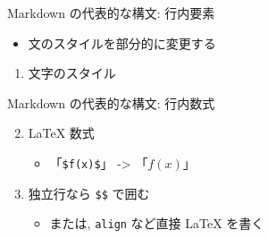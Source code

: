 \documentclass[
  ignorenonframetext,
]{beamer}
\providecommand{\tightlist}{%
  \setlength{\itemsep}{0pt}\setlength{\parskip}{0pt}}
\begin{document}
\begin{frame}[fragile]{Markdown の代表的な構文: 行内要素}
\protect\hypertarget{markdown-ux306eux4ee3ux8868ux7684ux306aux69cbux6587-ux884cux5185ux8981ux7d20}{}
\begin{itemize}
\tightlist
\item
  文のスタイルを部分的に変更する
\end{itemize}

\begin{enumerate}
\item
  文字のスタイル

\end{enumerate}
\end{frame}

\begin{frame}[fragile]{Markdown の代表的な構文: 行内数式}
\protect\hypertarget{markdown-ux306eux4ee3ux8868ux7684ux306aux69cbux6587-ux884cux5185ux6570ux5f0f}{}
\begin{enumerate}
\setcounter{enumi}{1}
\item
  LaTeX 数式

  \begin{itemize}
  \tightlist
  \item
    「\texttt{\$f(x)\$}」 -\textgreater{} 「\(f(x)\)」
  \end{itemize}
\item
  独立行なら \texttt{\$\$} で囲む

  \begin{itemize}
  \tightlist
  \item
    または, \texttt{align} など直接 LaTeX を書く
  \end{itemize}
\end{enumerate}
\end{frame}
\end{document}
